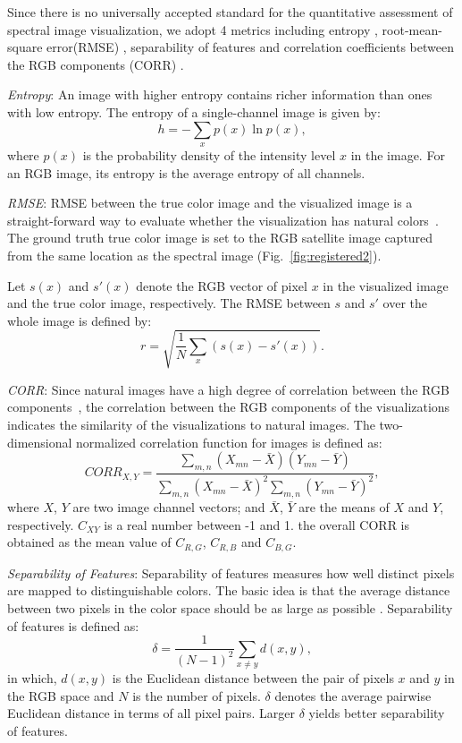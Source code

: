 \documentclass[10pt,conference,a4paper]{IEEEtran}
\begin{document}
Since there is no universally accepted standard for the quantitative assessment of spectral image visualization,  we adopt 4 metrics including entropy \cite{kotwal2010visualization}, root-mean-square error(RMSE) \cite{zhu2007evaluation}, separability of features \cite{cui2009interactive} and correlation coefficients between the RGB components (CORR) \cite{zhu2007evaluation}.

\emph{Entropy}: An image
with higher entropy contains richer information than ones with
low entropy. The entropy of a single-channel image is given by:
\begin{equation}\label{eq:entropy}
  h=-\sum_{x}p(x)\ln p(x),
\end{equation}
where $p(x)$ is the probability density of the intensity level $x$ in
the image. For an RGB image, its entropy is the average entropy
of all channels.

\emph{RMSE}: RMSE between the true color image and the visualized
image is a straight-forward way to evaluate whether the visualization
has natural colors~\cite{zhu2007evaluation}. The ground truth true color image is set to the RGB satellite image captured from the same location as the spectral image (Fig.~\ref{fig:registered2}).

Let $s(x)$ and $s'(x)$  denote the RGB vector of pixel $x$
in the visualized image and the true color image, respectively. The RMSE
between $s$ and $s'$ over the whole image is defined by:
\begin{equation}\label{eq:rmse}
  r = \sqrt{\frac{1}{N}\sum_x \left( s(x)-s'(x) \right)}.
\end{equation}

\emph{CORR}:
Since natural images have a high degree of correlation
between the RGB components~\cite{zhu2007evaluation}, the correlation between the RGB components of the
visualizations indicates the similarity of the visualizations to natural images.
The two-dimensional normalized correlation function for images is defined as:
\begin{equation}\label{eq:corr}
  CORR_{X,Y}=\frac{\sum_{m,n} (X_{mn}-\bar{X})(Y_{mn}-\bar{Y})}{\sum_{m,n}(X_{mn}-\bar{X})^2 \sum_{m,n} (Y_{mn}-\bar{Y})^2},
\end{equation}
where $X$, $Y$ are two image channel vectors; and $\bar{X}$, $\bar{Y}$ are the means
of $X$ and $Y$, respectively. $C_{XY}$ is a real number between -1
and 1.
the overall CORR is obtained as the mean value of $C_{R,G}$, $C_{R,B}$ and $C_{B,G}$.

\emph{Separability of Features}: Separability of features measures how
well distinct pixels are mapped to distinguishable colors. The
basic idea is that the average distance between two pixels in the
color space should be as large as possible \cite{cui2009interactive}.
Separability of features is defined as:
\begin{equation}\label{eq:separability}
  \delta= \frac{1}{(N-1)^2}\sum_{x\neq y}d(x,y),
\end{equation}
in which, $d(x,y)$ is the Euclidean distance between the pair of
pixels $x$ and $y$ in the RGB space and $N$ is the number of pixels.
$\delta$ denotes the average pairwise Euclidean distance in terms of
all pixel pairs. Larger $\delta$ yields better separability of
features.
\end{document}
